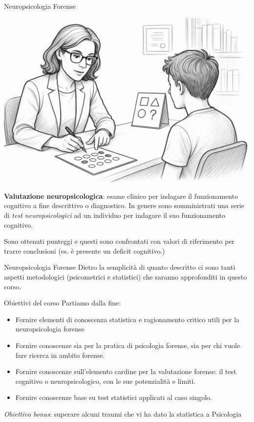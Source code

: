 \documentclass[
  ignorenonframetext,
]{beamer}
\providecommand{\tightlist}{%
  \setlength{\itemsep}{0pt}\setlength{\parskip}{0pt}}
\begin{document}
\begin{frame}{Neuropsicologia Forense}
\label{neuropsicologia-forense}
\begin{center}
\includegraphics[width=0.5\linewidth,height=\textheight,keepaspectratio]{Figures/Valutazione_Neuropsi_ChatGPT.png}
\end{center}
\pause

\textbf{Valutazione neuropsicologica}: esame clinico per indagare il
funzionamento cognitivo a fine descrittivo o diagnostico. In genere sono
somministrati una serie di \emph{test neuropsicologici} ad un individuo
per indagare il suo funzionamento cognitivo.

Sono ottenuti punteggi e questi sono confrontati con valori di
riferimento per trarre conclusioni (es. è presente un deficit
cognitivo.)
\end{frame}

\begin{frame}{Neuropsicologia Forense}
\label{neuropsicologia-forense-1}
Dietro la semplicità di quanto descritto ci sono tanti aspetti
metodologici (psicometrici e statistici) che saranno approfonditi in
questo corso.
\end{frame}

\begin{frame}{Obiettivi del corso}
\label{obiettivi-del-corso}
Partiamo dalla fine:

\begin{itemize}
\tightlist
\item
  Fornire elementi di conoscenza statistica e ragionamento critico utili
  per la neuropsicologia forense
\item
  Fornire conoscenze sia per la pratica di psicologia forense, sia per
  chi vuole fare ricerca in ambito forense.
\item
  Fornire conoscenze sull'elemento cardine per la valutazione forense:
  il test cognitivo o neuropsicologico, con le sue potenzialità e
  limiti.
\item
  Fornire conoscenze base su test statistici applicati al caso singolo.
\end{itemize}

\pause

\emph{Obiettivo bonus}: superare alcuni traumi che vi ha dato la
statistica a Psicologia
\end{frame}
\end{document}

